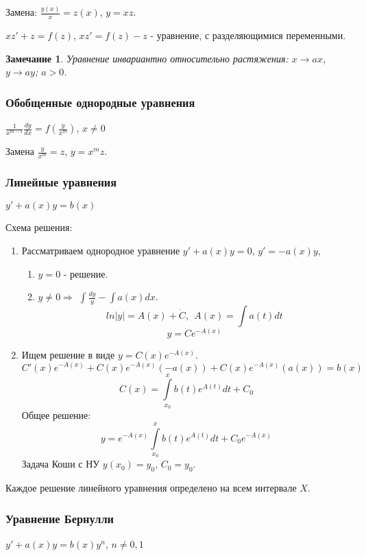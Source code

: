 \documentclass{article}
\newtheorem*{ntc}{Замечание}
\begin{document}
  \noindent Замена: $\frac{y(x)}{x} = z(x)$, $y = xz$. 
  
  \noindent $ xz' + z = f(z) $, $xz' = f(z) - z $ - уравнение, с разделяющимися переменными.
  
  \begin{ntc}
  Уравнение инвариантно относительно растяжения: $ x \rightarrow ax $, $ y \rightarrow ay $; $ a > 0 $.
  \end{ntc}
  
  \subsubsection{Обобщенные однородные уравнения}
  $\boxed{ \frac{1}{x^{m - 1}}\frac{dy}{dx} = f \left(\frac{y}{x^m}\right) }$, $ x \neq 0 $
  
  \noindent Замена $\frac{y}{x^m} = z$, $y = x^m z$.
  
  \subsubsection{Линейные уравнения}
  $\boxed{ y' + a(x)y = b(x) }$
  
  \noindent Схема решения:
  \begin{enumerate}
  \item Рассматриваем однородное уравнение $y' + a(x)y = 0$, $y' = -a(x)y$,
    \begin{enumerate}
    \item $y = 0$ - решение.
    \item $y \neq 0 \Rightarrow$ $\int \frac{dy}{y} -\int a(x)dx$.
    $$ ln|y| = A(x) + \dot{C},~~ A(x) = \int a(t)dt $$
    $$ y = Ce^{-A(x)} $$
    \end{enumerate}
    \item Ищем решение в виде $ y = C(x)e^{-A(x)} $.
    $$ C'(x)e^{-A(x)} + C(x)e^{-A(x)}\left(-a(x)\right) + C(x)e^{-A(x)}\left(a(x)\right) = b(x) $$
    $$ C(x) = \int\limits_{x_0}^{x} b(t)e^{A(t)}dt + C_0 $$
    Общее решение:
    $$ y = e^{-A(x)} \int\limits_{x_0}^{x}b(t)e^{A(t)}dt + C_0e^{-A(x)} $$
    Задача Коши с НУ $y(x_0) = y_0$, $C_0 = y_0$.
  \end{enumerate}
  Каждое решение линейного уравнения определено на всем интервале $X$.
  
  \subsubsection{Уравнение Бернулли}
  $ \boxed{y' + a(x)y = b(x) y^n} $, $n \neq 0, 1 $
  
\end{document}
